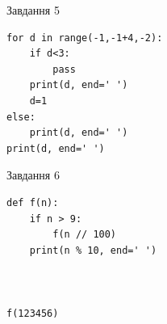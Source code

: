 \documentclass[12pt, ukrainian]{article}
\begin{document}
{\vspace{15mm}
\begin{minipage}[t]{9.7cm}                
{\begin{center}Завдання {5}\end{center}}
\begin{verbatim}
for d in range(-1,-1+4,-2):
    if d<3:
        pass
    print(d, end=' ')
    d=1
else:
    print(d, end=' ')
print(d, end=' ')
\end{verbatim}     
\end{minipage}
\vline \hspace{8mm}
\begin{minipage}[t]{8.0cm}                
{\begin{center}Завдання {6}\end{center}}
\begin{verbatim}
def f(n):
    if n > 9:
        f(n // 100)
    print(n % 10, end=' ')
    


f(123456)
\end{verbatim}     
\end{minipage}

}
\newpage
\end{document}
